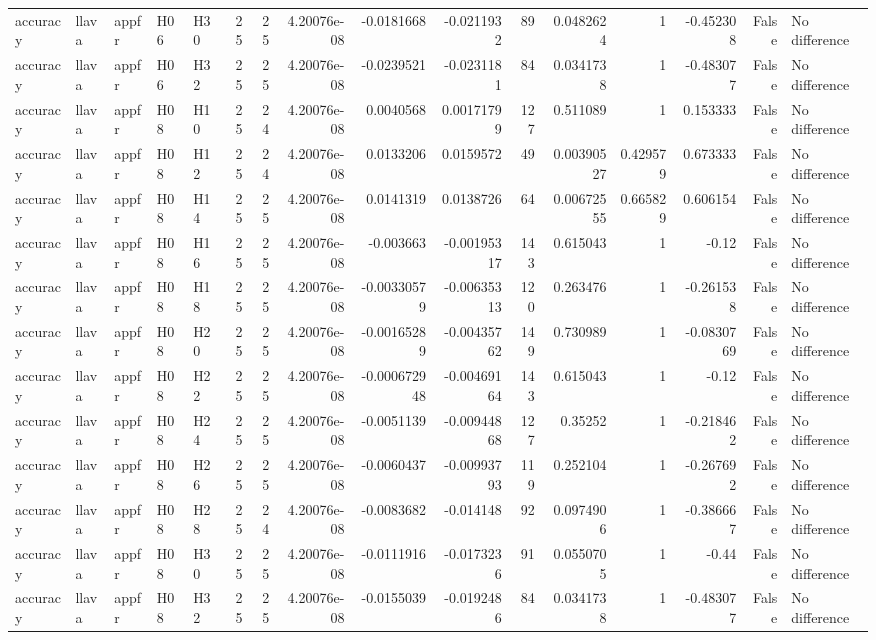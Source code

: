 \begin{longtable}{lllllrrrrrrrrrrl}
accuracy & llava & appfr & H06 & H30 & 25 & 25 & 4.20076e-08 & -0.0181668 & -0.0211932 & 89 & 0.0482624 & 1 & -0.452308 & False & No difference \\
accuracy & llava & appfr & H06 & H32 & 25 & 25 & 4.20076e-08 & -0.0239521 & -0.0231181 & 84 & 0.0341738 & 1 & -0.483077 & False & No difference \\
accuracy & llava & appfr & H08 & H10 & 25 & 24 & 4.20076e-08 & 0.0040568 & 0.00171799 & 127 & 0.511089 & 1 & 0.153333 & False & No difference \\
accuracy & llava & appfr & H08 & H12 & 25 & 24 & 4.20076e-08 & 0.0133206 & 0.0159572 & 49 & 0.00390527 & 0.429579 & 0.673333 & False & No difference \\
accuracy & llava & appfr & H08 & H14 & 25 & 25 & 4.20076e-08 & 0.0141319 & 0.0138726 & 64 & 0.00672555 & 0.665829 & 0.606154 & False & No difference \\
accuracy & llava & appfr & H08 & H16 & 25 & 25 & 4.20076e-08 & -0.003663 & -0.00195317 & 143 & 0.615043 & 1 & -0.12 & False & No difference \\
accuracy & llava & appfr & H08 & H18 & 25 & 25 & 4.20076e-08 & -0.00330579 & -0.00635313 & 120 & 0.263476 & 1 & -0.261538 & False & No difference \\
accuracy & llava & appfr & H08 & H20 & 25 & 25 & 4.20076e-08 & -0.00165289 & -0.00435762 & 149 & 0.730989 & 1 & -0.0830769 & False & No difference \\
accuracy & llava & appfr & H08 & H22 & 25 & 25 & 4.20076e-08 & -0.000672948 & -0.00469164 & 143 & 0.615043 & 1 & -0.12 & False & No difference \\
accuracy & llava & appfr & H08 & H24 & 25 & 25 & 4.20076e-08 & -0.0051139 & -0.00944868 & 127 & 0.35252 & 1 & -0.218462 & False & No difference \\
accuracy & llava & appfr & H08 & H26 & 25 & 25 & 4.20076e-08 & -0.0060437 & -0.00993793 & 119 & 0.252104 & 1 & -0.267692 & False & No difference \\
accuracy & llava & appfr & H08 & H28 & 25 & 24 & 4.20076e-08 & -0.0083682 & -0.014148 & 92 & 0.0974906 & 1 & -0.386667 & False & No difference \\
accuracy & llava & appfr & H08 & H30 & 25 & 25 & 4.20076e-08 & -0.0111916 & -0.0173236 & 91 & 0.0550705 & 1 & -0.44 & False & No difference \\
accuracy & llava & appfr & H08 & H32 & 25 & 25 & 4.20076e-08 & -0.0155039 & -0.0192486 & 84 & 0.0341738 & 1 & -0.483077 & False & No difference \\

\end{longtable}
